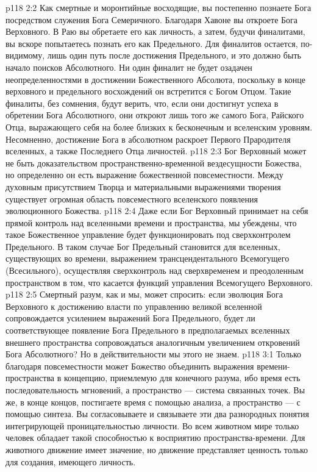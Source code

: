 \vs p118 2:2 \pc Как смертные и моронтийные восходящие, вы постепенно познаете Бога посредством служения Бога Семеричного. Благодаря Хавоне вы откроете Бога Верховного. В Раю вы обретаете его как личность, а затем, будучи финалитами, вы вскоре попытаетесь познать его как Предельного. Для финалитов остается, по\hyp{}видимому, лишь один путь после достижения Предельного, и это должно быть начало поисков Абсолютного. Ни один финалит не будет озадачен неопределенностями в достижении Божественного Абсолюта, поскольку в конце верховного и предельного восхождений он встретится с Богом Отцом. Такие финалиты, без сомнения, будут верить, что, если они достигнут успеха в обретении Бога Абсолютного, они откроют лишь того же самого Бога, Райского Отца, выражающего себя на более близких к бесконечным и вселенским уровням. Несомненно, достижение Бога в абсолютном раскроет Первого Прародителя вселенных, а также Последнего Отца личностей.
\vs p118 2:3 Бог Верховный может не быть доказательством пространственно\hyp{}временной вездесущности Божества, но определенно он есть выражение божественной повсеместности. Между духовным присутствием Творца и материальными выражениями творения существует огромная область повсеместного  вселенского появления эволюционного Божества.
\vs p118 2:4 Даже если Бог Верховный принимает на себя прямой контроль над вселенными времени и пространства, мы убеждены, что такое Божественное управление будет функционировать под сверхконтролем Предельного. В таком случае Бог Предельный становится для вселенных, существующих во времени, выражением трансцендентального Всемогущего (Всесильного), осуществляя сверхконтроль над сверхвременем и преодоленным пространством в том, что касается функций управления Всемогущего Верховного.
\vs p118 2:5 Смертный разум, как и мы, может спросить: если эволюция Бога Верховного к достижению власти по управлению великой вселенной сопровождается усилением выражений Бога Предельного, будет ли соответствующее появление Бога Предельного в предполагаемых вселенных внешнего пространства сопровождаться аналогичным увеличением откровений Бога Абсолютного? Но в действительности мы этого не знаем.
\vs p118 3:1 Только благодаря повсеместности может Божество объединить выражения времени\hyp{}пространства в концепцию, приемлемую для конечного разума, ибо время есть последовательность мгновений, а пространство --- система связанных точек. Вы же, в конце концов, постигаете время с помощью анализа, а пространство --- с помощью синтеза. Вы согласовываете и связываете эти два разнородных понятия интегрирующей проницательностью личности. Во всем животном мире только человек обладает такой способностью к восприятию пространства\hyp{}времени. Для животного движение имеет значение, но движение представляет ценность только для создания, имеющего личность.
